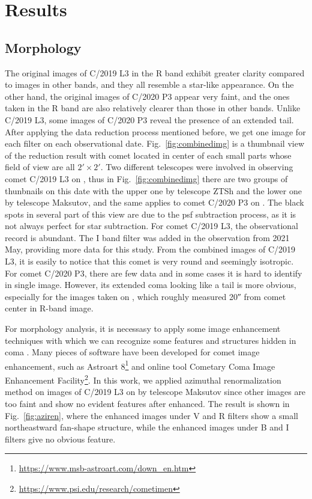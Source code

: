 \section{Results} \label{sec:res}

\subsection{Morphology}

The original images of C/2019 L3 in the R band exhibit greater clarity compared to images in other bands, and they all resemble a star-like appearance. On the other hand, the original images of C/2020 P3 appear very faint, and the ones taken in the R band are also relatively clearer than those in other bands. Unlike C/2019 L3, some images of C/2020 P3 reveal the presence of an extended tail. After applying the data reduction process mentioned before, we get one image for each filter on each observational date. Fig.~\ref{fig:combinedimg} is a thumbnail view of the reduction result with comet located in center of each small parts whose field of view are all $\ang{;2;} \times \ang{;2;}$. Two different telescopes were involved in observing comet C/2019 L3 on , thus in Fig.~\ref{fig:combinedimg} there are two groups of thunbnails on this date with the upper one by telescope ZTSh and the lower one by telescope Maksutov, and the same applies to comet C/2020 P3 on . The black spots in several part of this view are due to the psf subtraction process, as it is not always perfect for star subtraction. For comet C/2019 L3, the observational record is abundant. The I band filter was added in the observation from 2021 May, providing more data for this study. From the combined images of C/2019 L3, it is easily to notice that this comet is very round and seemingly isotropic. For comet C/2020 P3, there are few data and in some cases it is hard to identify in single image. However, its extended coma looking like a tail is more obvious, especially for the images taken on , which roughly measured \ang{;;20} from comet center in R-band image. 

For morphology analysis, it is necessasy to apply some image enhancement techniques with which we can recognize some features and structures hidden in coma \citep{samarasinha_image_2014}. Many pieces of software have been developed for comet image enhancement, such as Astroart 8\footnote{\href{https://www.msb-astroart.com/down_en.htm}{https://www.msb-astroart.com/down\_en.htm}} and online tool Cometary Coma Image Enhancement Facility\footnote{\href{https://www.psi.edu/research/cometimen}{https://www.psi.edu/research/cometimen}}. In this work, 
we applied azimuthal renormalization method on images of C/2019 L3 on  by telescope Maksutov since other images are too faint and show no evident features after enhanced. The result is shown in Fig.~\ref{fig:aziren}, where the enhanced images under V and R filters show a small northeastward fan-shape structure, while the enhanced images under B and I filters give no obvious feature.  

